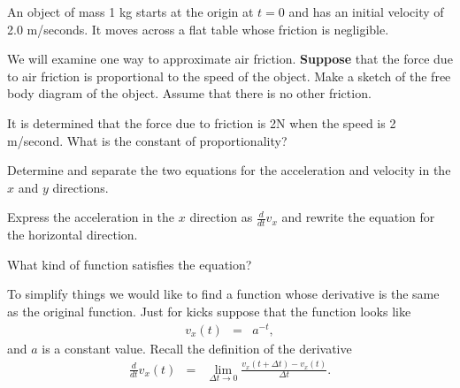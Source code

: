 \begin{problem}
\item An object of mass 1 kg starts at the origin at $t=0$ and has an
  initial velocity of 2.0 m/seconds. It moves across a flat table
  whose friction is negligible.
  \begin{subproblem}
  \item We will examine one way to approximate air friction.
    \textbf{Suppose} that the force due to air friction is
    proportional to the speed of the object.  Make a sketch of the
    free body diagram of the object. Assume that there is no other
    friction.  

    \vfill

  \item It is determined that the force due to friction is 2N when the
    speed is 2 m/second. What is the constant of proportionality? 

    \vspace{4em}

  \item Determine and separate the two equations for the acceleration
    and velocity in the $x$ and $y$ directions.

    \vfill

  \item Express the acceleration in the $x$ direction as $\frac{d}{dt}
    v_x$ and rewrite the equation for the horizontal direction.
    \vspace{4em}

  \item What kind of function satisfies the equation?

    \vspace{4em}

  \end{subproblem}

  \clearpage

\item To simplify things we would like to find a function whose
  derivative is the same as the original function. Just for kicks
  suppose that the function looks like
  \begin{eqnarray*}
    v_x(t) & = & a^{-t},
  \end{eqnarray*}
  and $a$ is a constant value. Recall the definition of the derivative
  \begin{eqnarray*}
    \frac{d}{dt} v_x(t) & = & \lim_{\Delta t \rightarrow 0}
                              \frac{v_x(t+\Delta t) - v_x(t)}{\Delta t}.
  \end{eqnarray*}


\end{problem}
